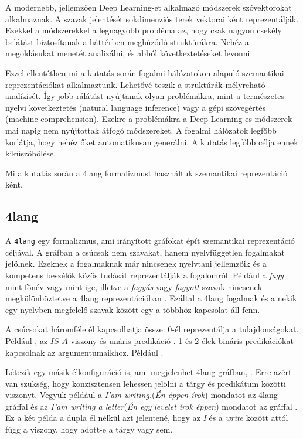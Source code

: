 A modernebb, jellemzően Deep Learning-et alkalmazó módszerek szóvektorokat alkalmaznak.
A szavak jelentését sokdimenziós terek vektorai ként reprezentálják.
Ezekkel a módszerekkel a legnagyobb probléma az, hogy csak nagyon csekély belátást biztosítanak a háttérben meghúzódó struktúrákra.
Nehéz a megoldásukat menetét analizálni, és abból következtetéseket levonni.

Ezzel ellentétben mi a kutatás során fogalmi hálózatokon alapuló szemantikai reprezentációkat alkalmaztunk.
Lehetővé teszik a struktúrák mélyreható analízisét.
Így jobb rálátást nyújtanak olyan problémákra, mint a természetes nyelvi következtetés (natural language inference) vagy a gépi szövegértés (machine comprehension).
Ezekre a problémákra a Deep Learning-es módszerek mai napig nem nyújtottak átfogó módszereket.
A fogalmi hálózatok legfőbb korlátja, hogy nehéz őket automatikusan generálni.
A kutatás legfőbb célja ennek kiküszöbölése.

Mi a kutatás során a 4lang formalizmust használtuk szemantikai reprezentáció ként.

\subsection{4lang}
\label{sec:4lang}
A \texttt{4lang}  \cite{Kornai:2015} egy formalizmus, ami irányított gráfokat épít szemantikai reprezentáció céljával. A gráfban a csúcsok nem szavakat, hanem nyelvfüggetlen fogalmakat jelölnek. Ezeknek a fogalmaknak már nincsenek nyelvtani jellemzőik és a kompetens beszélők közös tudását reprezentálják a fogalomról. Például a \textit{fagy} mint főnév vagy mint ige, illetve a \textit{fagyás} vagy \textit{fagyott} szavak nincsenek megkülönböztetve a 4lang reprezentációban \cite{Recski:2018}. Ezáltal a 4lang fogalmak és a nekik egy nyelvben megfelelő szavak között egy a többhöz kapcsolat áll fenn.

A csúcsokat háromféle él kapcsolhatja össze:
0-él reprezentálja a tulajdonságokat. Például , az \textit{$IS\_A$} viszony  és unáris predikáció .
1 és 2-élek bináris predikációkat kapcsolnak az argumentumaikhoz. Például .

Létezik egy másik élkonfiguráció is, ami megjelenhet 4lang gráfban,  . Erre azért van szükség, hogy konzisztensen lehessen jelölni a tárgy és predikátum közötti viszonyt. Vegyük például a \textit{I’am writing.}(\textit{Én éppen írok})  mondatot az  4lang gráffal és az \textit{I’am writing a letter}(\textit{Én egy levelet írok éppen}) mondatot az  gráffal . Ez a két példa a dupla él nélkül azt jelentené, hogy  az \textit{I} és a \textit{write} között attól függ a viszony, hogy adott-e a tárgy vagy sem. \cite{Recski:2018}

